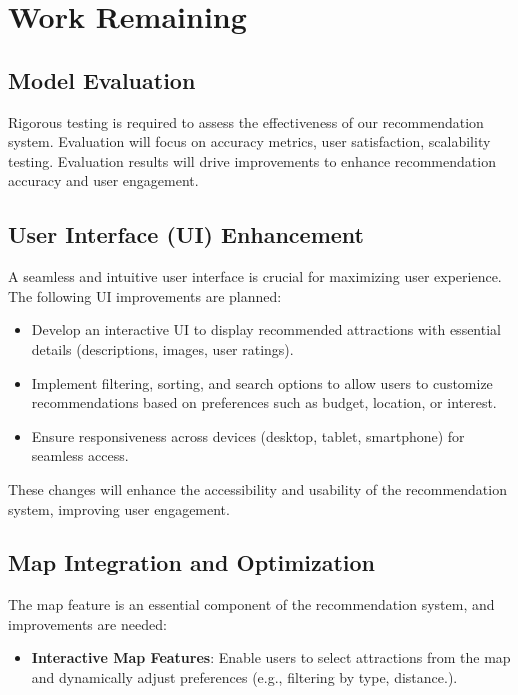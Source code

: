\chapter{Work Remaining}

\section{Model Evaluation}
Rigorous testing is required to assess the effectiveness of our recommendation system. Evaluation will focus on accuracy metrics, user satisfaction, scalability testing.
Evaluation results will drive improvements to enhance recommendation accuracy and user engagement.

\section{User Interface (UI) Enhancement}
A seamless and intuitive user interface is crucial for maximizing user experience. The following UI improvements are planned:

\begin{itemize}
    \item Develop an interactive UI to display recommended attractions with essential details (descriptions, images, user ratings).
    \item Implement filtering, sorting, and search options to allow users to customize recommendations based on preferences such as budget, location, or interest.
    \item Ensure responsiveness across devices (desktop, tablet, smartphone) for seamless access.
\end{itemize}

These changes will enhance the accessibility and usability of the recommendation system, improving user engagement.

\section{Map Integration and Optimization}
The map feature is an essential component of the recommendation system, and improvements are needed:

\begin{itemize}
    \item \textbf{Interactive Map Features}: Enable users to select attractions from the map and dynamically adjust preferences (e.g., filtering by type, distance.).
\end{itemize}

